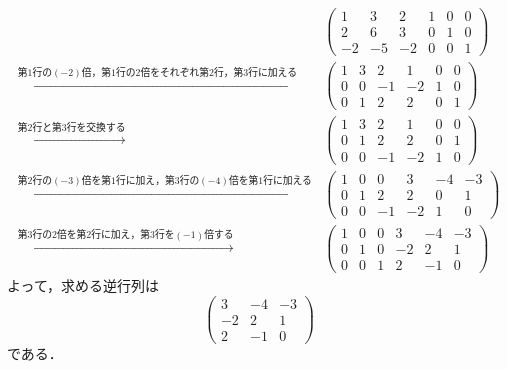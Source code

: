 \documentclass[uplatex,dvipdfmx,a4paper,11pt,fleqn]{jsarticle}
\begin{document}
\begin{tleftbar}
    \begin{align*} 
        &
        \left( 
            \begin{array}{ccc|ccc}
            1 & 3 & 2 & 1 & 0 & 0\\ 
            2 & 6 & 3 & 0 & 1 & 0 \\ 
            -2 & -5 & -2 & 0 & 0 & 1
            \end{array}
            \right) \\
           \xrightarrow{\text{第$1$行の$(-2)$倍，第$1$行の$2$倍をそれぞれ第$2$行，第$3$行に加える}} &
            \left( \begin{array}{ccc|ccc}
                1 & 3 & 2 & 1 & 0 & 0\\ 
                0 & 0 & -1 & -2 & 1 & 0 \\ 
                0 & 1 & 2 & 2 & 0 & 1
                \end{array}
                \right)\\
                \xrightarrow{\text{第$2$行と第$3$行を交換する}} &
                \left( \begin{array}{ccc|ccc}
                    1 & 3 & 2 & 1 & 0 & 0\\ 
                    0 & 1 & 2 & 2 & 0 & 1 \\
                    0 & 0 & -1 & -2 & 1 & 0 
                    \end{array}
                    \right)\\
                   \xrightarrow{\text{第$2$行の$(-3)$倍を第$1$行に加え，第$3$行の$(-4)$倍を第$1$行に加える}} &
                    \left( \begin{array}{ccc|ccc}
                    1 & 0 & 0 & 3 & -4 & -3\\ 
                    0 & 1 & 2 & 2 & 0 & 1 \\
                    0 & 0 & -1 & -2 & 1 & 0 
                        \end{array}
                        \right) \\
                        \xrightarrow{\text{第$3$行の$2$倍を第$2$行に加え，第$3$行を$(-1)$倍する}} &
                         \left( \begin{array}{ccc|ccc}
                            1 & 0 & 0 & 3 & -4 & -3\\ 
                            0 & 1 & 0 & -2 & 2 & 1 \\
                            0 & 0 & 1 & 2 & -1 & 0 
                             \end{array}
                             \right)
                            \end{align*}
        よって，求める逆行列は
        \[
            \begin{pmatrix} 
                3 & -4 & -3 \\
                -2 & 2 & 1 \\
                2 & -1 & 0 
            \end{pmatrix}
        \]
        である．
    \end{tleftbar}
\end{document}
